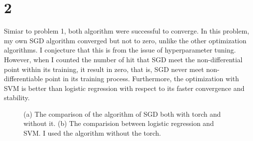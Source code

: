 \documentclass[10pt]{article}
\begin{document}
\section*{2}
Simiar to problem 1, both algorithm were successful to converge. In this problem, my own SGD algorithm converged but not to zero, unlike the other optimization algorithms.
I conjecture that this is from the issue of hyperparameter tuning.
However, when I counted the number of hit that SGD meet the non-differential point within its training, it result in zero, that is, SGD never meet non-differentiable point in its training process. 
Furthermore, the optimization with SVM is better than logistic regression with respect to its faster convergence and stability.

\begin{figure}[!h]
    \begin{center}
        \label{fig2}
    \end{center}
    \caption{(a) The comparison of the algorithm of SGD both with torch and without it. (b) The comparision between logistic regression and SVM. I used the algorithm without the torch.}
\end{figure}
\end{document}
